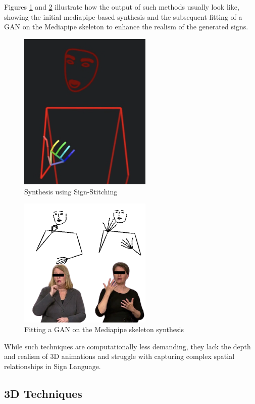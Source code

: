 \documentclass[../../main.tex]{subfiles}
\begin{document}
Figures \ref{fig:synthesis_mediaipe_2d} and \ref{fig:synthesis_gan_2d} illustrate how the output of such methods usually look like, showing the initial mediapipe-based synthesis and the subsequent fitting of a GAN on the Mediapipe skeleton to enhance the realism of the generated signs.

\begin{figure} 
  \centering \includegraphics[width = 2.5in]{chapters/background_work/images/sign_writing_synthesis.png} 
  \caption{Synthesis using Sign-Stitching} 
  \label{fig:synthesis_mediaipe_2d} 
\end{figure}

\begin{figure} 
  \centering \includegraphics[width = 2.5in]{chapters/background_work/images/gan_synthesis.png} 
  \caption{Fitting a GAN on the Mediapipe skeleton synthesis} 
  \label{fig:synthesis_gan_2d} 
\end{figure}

While such techniques are computationally less demanding, they lack the depth and realism of 3D animations and struggle with capturing complex spatial relationships in Sign Language.

\subsection{3D Techniques}
\label{subsec:3d_techniques}
\end{document}
